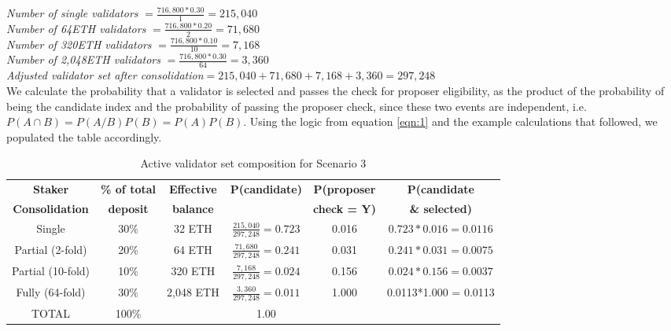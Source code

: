 \noindent
\textit{Number of single validators} $= \frac{716,800 * 0.30}{1} = 215,040 $ \\
\textit{Number of 64ETH validators} $= \frac{716,800 * 0.20}{2} = 71,680 $ \\
\textit{Number of 320ETH validators} $= \frac{716,800 * 0.10}{10} = 7,168 $ \\
\textit{Number of 2,048ETH validators} $= \frac{716,800 * 0.30}{64} = 3,360 $ \\
\textit{Adjusted validator set after consolidation}$ = 215,040 + 71,680 + 7,168 + 3,360 = 297,248$ \\

\noindent
 We calculate the probability that a validator is selected and passes the check for proposer eligibility, as the product of the probability of being the candidate index  and the probability of passing the proposer check, since these two events are independent, i.e. $P(A \cap B) = P(A/B)P(B) = P(A)P(B)$. Using the logic from equation \ref{eqn:1} and the example calculations that followed, we populated the table accordingly.
\begingroup
\renewcommand{\arraystretch}{1.5} %
\begin{table}[htp]
\caption{Active validator set composition for Scenario 3}
\label{tbl:scenario3}
\begin{center}
\begin{tabular}{|c|c|c|c|c|c|}
\hline
\textbf{Staker} & \textbf{\% of total} & \textbf{Effective} & \textbf{P(candidate)} & \textbf{P(proposer} & \textbf{P(candidate} \\
\textbf{Consolidation} & \textbf{deposit } & \textbf{balance} &\textbf{ } & \textbf{check = Y) } & \textbf{ \& selected)} \\
\hline
Single & 30\% & 32 ETH & $\frac{215,040}{297,248} = 0.723$ & 0.016 & $0.723*0.016 = 0.0116$\\
Partial (2-fold) & 20\% & 64 ETH & $\frac{71,680}{297,248} = 0.241$ & 0.031 & $0.241*0.031 = 0.0075$\\
Partial (10-fold) & 10\% & 320 ETH & $\frac{7,168}{297,248} = 0.024$ & 0.156 & $0.024*0.156 = 0.0037$\\
Fully (64-fold) & 30\% & 2,048 ETH & $\frac{3,360}{297,248} = 0.011$ & 1.000 & 0.0113*1.000 = 0.0113 \\
\hline
TOTAL & 100\% & \texttt{ } & 1.00 & \texttt{ } &  \texttt{ } \\
\hline

\end{tabular}
\end{center}
\end{table}%
\endgroup

